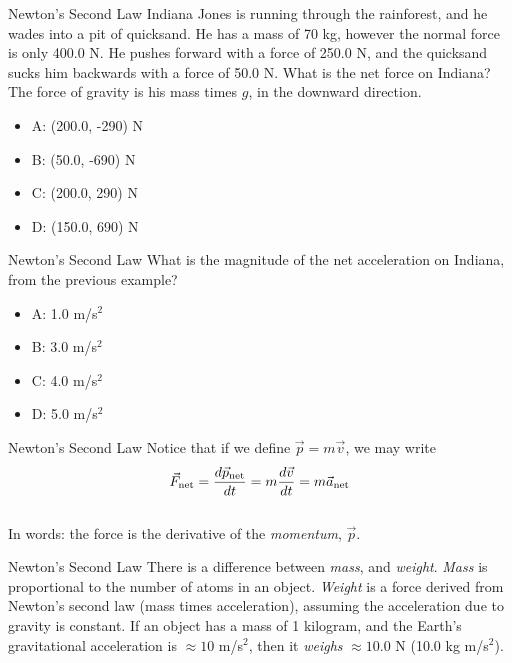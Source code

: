 \documentclass{beamer}
\begin{document}
\begin{frame}{Newton's Second Law}
Indiana Jones is running through the rainforest, and he wades into a pit of quicksand.  He has a mass of 70 kg, however the normal force is only 400.0 N.  He pushes forward with a force of 250.0 N, and the quicksand sucks him backwards with a force of 50.0 N.  What is the net force on Indiana?  The force of gravity is his mass times $g$, in the downward direction.
\begin{itemize}
\item A: (200.0, -290) N
\item B: (50.0, -690) N
\item C: (200.0, 290) N
\item D: (150.0, 690) N
\end{itemize}
\end{frame}

\begin{frame}{Newton's Second Law}
What is the magnitude of the net acceleration on Indiana, from the previous example?
\begin{itemize}
\item A: 1.0 m/s$^2$
\item B: 3.0 m/s$^2$
\item C: 4.0 m/s$^2$
\item D: 5.0 m/s$^2$
\end{itemize}
\end{frame}

\begin{frame}{Newton's Second Law}
Notice that if we define $\vec{p} = m\vec{v}$, we may write \\
\vspace{0.5cm}
\begin{equation}
\vec{F}_{\rm net} = \frac{d\vec{p}_{\rm net}}{dt} = m \frac{d\vec{v}}{dt} = m \vec{a}_{\rm net}
\end{equation} \\
\vspace{0.5cm}
In words: the force is the derivative of the \textit{momentum}, $\vec{p}$.
\end{frame}

\begin{frame}{Newton's Second Law}
There is a difference between \alert{\textit{mass}}, and \alert{\textit{weight}}.  \textit{Mass} is proportional to the number of atoms in an object.  \textit{Weight} is a force derived from Newton's second law (mass times acceleration), assuming the acceleration due to gravity is constant.  If an object has a mass of 1 kilogram, and the Earth's gravitational acceleration is $\approx 10$ m/s$^2$, then it \textit{weighs} $\approx 10.0$ N (10.0 kg m/s$^2$).
\end{frame}
\end{document}

